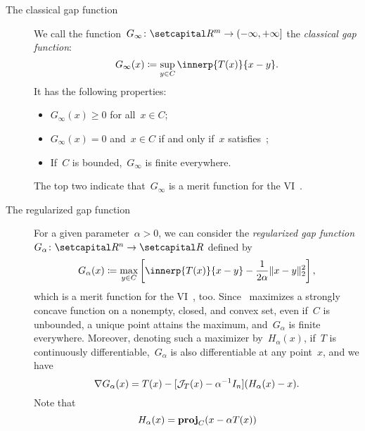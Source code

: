 \documentclass[../../main]{subfiles}
\begin{document}
\begin{example} 
    \begin{description}
        \item[The classical gap function~\cite{Auslender1976,Hearn1982}]
            We call the function~$G_\infty \colon \setR^m \to (-\infty, +\infty]$ the \emph{classical gap function}:
            \begin{equation} \label{eq:gap}
                G_\infty(x) \coloneqq \sup_{y \in C} \innerp{T(x)}{x - y}
            .\end{equation} 
            It has the following properties:
            \begin{itemize}
                \item $G_\infty(x) \ge 0$ for all~$x \in C$;
                \item $G_\infty(x) = 0$ and~$x \in C$ if and only if~$x$ satisfies~;
                \item If~$C$ is bounded,~$G_\infty$ is finite everywhere.
            \end{itemize}
            The top two indicate that~$G_\infty$ is a merit function for the VI~.
        \item[The regularized gap function~\cite{Fukushima1992,Auchmuty1989}]
            For a given parameter~$\alpha > 0$, we can consider the \emph{regularized gap function}~$G_\alpha \colon \setR^n \to \setR$ defined by
            \begin{equation} \label{eq:reg_gap}
                G_\alpha(x) \coloneqq \max_{y \in C} \left[ \innerp{T(x)}{x - y} - \frac{1}{2 \alpha} \norm{x - y}_2^2 \right] 
            ,\end{equation} 
            which is a merit function for the VI~, too.
            Since~ maximizes a strongly concave function on a nonempty, closed, and convex set, even if~$C$ is unbounded, a unique point attains the maximum, and~$G_\alpha$ is finite everywhere.
            Moreover, denoting such a maximizer by~$H_\alpha(x)$, if~$T$ is continuously differentiable,~$G_\alpha$ is also differentiable at any point~$x$, and we have
            \begin{equation}
                \nabla G_\alpha(x) = T(x) - [ \mathcal{J}_{T}(x) - \alpha^{-1} I_n ] (H_\alpha(x) - x)
            .\end{equation} 
            Note that
            \begin{equation}
                H_\alpha(x) = \proj_C(x - \alpha T(x))

\end{equation}
\end{description}
\end{example}
\end{document}
